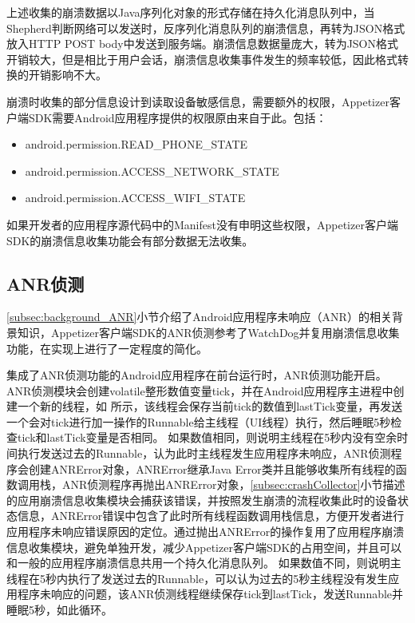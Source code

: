  上述收集的崩溃数据以Java序列化对象的形式存储在持久化消息队列中，当Shepherd判断网络可以发送时，反序列化消息队列的崩溃信息，再转为JSON格式放入HTTP POST body中发送到服务端。崩溃信息数据量庞大，转为JSON格式开销较大，但是相比于用户会话，崩溃信息收集事件发生的频率较低，因此格式转换的开销影响不大。
 
 崩溃时收集的部分信息设计到读取设备敏感信息，需要额外的权限，Appetizer客户端SDK需要Android应用程序提供的权限原由来自于此。包括：
 
\begin{itemize}
 	\item android.permission.READ\_PHONE\_STATE
 	\item android.permission.ACCESS\_NETWORK\_STATE
 	\item android.permission.ACCESS\_WIFI\_STATE
\end{itemize}

如果开发者的应用程序源代码中的Manifest没有申明这些权限，Appetizer客户端SDK的崩溃信息收集功能会有部分数据无法收集。

\subsection{ANR侦测}
\label{subsec:ANRCollector}



\ref{subsec:background_ANR}小节介绍了Android应用程序未响应（ANR）的相关背景知识，Appetizer客户端SDK的ANR侦测参考了WatchDog并复用崩溃信息收集功能，在实现上进行了一定程度的简化。

集成了ANR侦测功能的Android应用程序在前台运行时，ANR侦测功能开启。ANR侦测模块会创建volatile整形数值变量tick，并在Android应用程序主进程中创建一个新的线程，如
所示，该线程会保存当前tick的数值到lastTick变量，再发送一个会对tick进行加一操作的Runnable给主线程（UI线程）执行，然后睡眠5秒检查tick和lastTick变量是否相同。
如果数值相同，则说明主线程在5秒内没有空余时间执行发送过去的Runnable，认为此时主线程发生应用程序未响应，ANR侦测程序会创建ANRError对象，ANRError继承Java Error类并且能够收集所有线程的函数调用栈，ANR侦测程序再抛出ANRError对象，\ref{subsec:crashCollector}小节描述的应用崩溃信息收集模块会捕获该错误，并按照发生崩溃的流程收集此时的设备状态信息，ANRError错误中包含了此时所有线程函数调用栈信息，方便开发者进行应用程序未响应错误原因的定位。通过抛出ANRError的操作复用了应用程序崩溃信息收集模块，避免单独开发，减少Appetizer客户端SDK的占用空间，并且可以和一般的应用程序崩溃信息共用一个持久化消息队列。
如果数值不同，则说明主线程在5秒内执行了发送过去的Runnable，可以认为过去的5秒主线程没有发生应用程序未响应的问题，该ANR侦测线程继续保存tick到lastTick，发送Runnable并睡眠5秒，如此循环。

